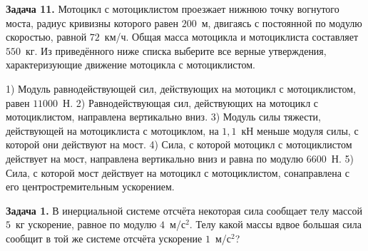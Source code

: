 \begin{taskbasic}[code={\label{task:newton2_v10_n5}}]
\textbf{Задача 11.} Мотоцикл с мотоциклистом проезжает нижнюю точку вогнутого моста, радиус кривизны которого равен $200$~м, двигаясь с постоянной по модулю скоростью, равной $72$~км/ч. Общая масса мотоцикла и мотоциклиста составляет $550$~кг. Из приведённого ниже списка выберите все верные утверждения, характеризующие движение мотоцикла с мотоциклистом.

1) Модуль равнодействующей сил, действующих на мотоцикл с мотоциклистом, равен $11000$~Н.
2) Равнодействующая сил, действующих на мотоцикл с мотоциклистом, направлена вертикально вниз.
3) Модуль силы тяжести, действующей на мотоциклиста с мотоциклом, на $1{,}1$~кН меньше модуля силы, с которой они действуют на мост.
4) Сила, с которой мотоцикл с мотоциклистом действует на мост, направлена вертикально вниз и равна по модулю $6600$~Н.
5) Сила, с которой мост действует на мотоцикл с мотоциклистом, сонаправлена с его центростремительным ускорением.

\end{taskbasic}


\begin{taskbasic}[code={\label{task:newton2_v11_n2}}]
\textbf{Задача 1.} В инерциальной системе отсчёта некоторая сила сообщает телу массой $5$~кг ускорение, равное по модулю $4$~м/с$^{2}$. Телу какой массы вдвое большая сила сообщит в той же системе отсчёта ускорение $1$~м/с$^{2}$?

\end{taskbasic}

